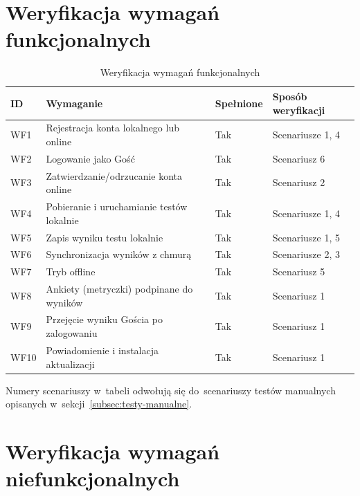 \documentclass[12pt, a4paper, oneside]{report}
\begin{document}
\section{Weryfikacja wymagań funkcjonalnych}
\label{sec:wer-funk}

\begin{table}[H]
	\centering
	\caption{Weryfikacja wymagań funkcjonalnych}
	\label{tab:wer-funk}
	\begin{tabular}{p{1cm} p{7cm} p{2cm} p{3cm}}
		\toprule
		\textbf{ID} & \textbf{Wymaganie}                        & \textbf{Spełnione}
		            & \textbf{Sposób weryfikacji}                                                       \\
		\midrule
		WF1         & Rejestracja konta lokalnego lub online    & Tak                & Scenariusze 1, 4 \\
		WF2         & Logowanie jako Gość                       & Tak                & Scenariusz 6     \\
		WF3         & Zatwierdzanie/odrzucanie konta online     & Tak                & Scenariusz 2     \\
		WF4         & Pobieranie i uruchamianie testów lokalnie & Tak                & Scenariusze 1, 4 \\
		WF5         & Zapis wyniku testu lokalnie               & Tak                & Scenariusze 1, 5 \\
		WF6         & Synchronizacja wyników z chmurą           & Tak                & Scenariusze 2, 3 \\
		WF7         & Tryb offline                              & Tak                & Scenariusz 5     \\
		WF8         & Ankiety (metryczki) podpinane do wyników  & Tak                & Scenariusz 1     \\
		WF9         & Przejęcie wyniku Gościa po zalogowaniu    & Tak                & Scenariusz 1     \\
		WF10        & Powiadomienie i instalacja aktualizacji   & Tak                & Scenariusz 1     \\
		\bottomrule
	\end{tabular}
\end{table}

Numery scenariuszy w~tabeli odwołują się do~scenariuszy testów manualnych opisanych w~sekcji~\ref{subsec:testy-manualne}.


\section{Weryfikacja wymagań niefunkcjonalnych}
\label{sec:wer-niefunk}
\end{document}
